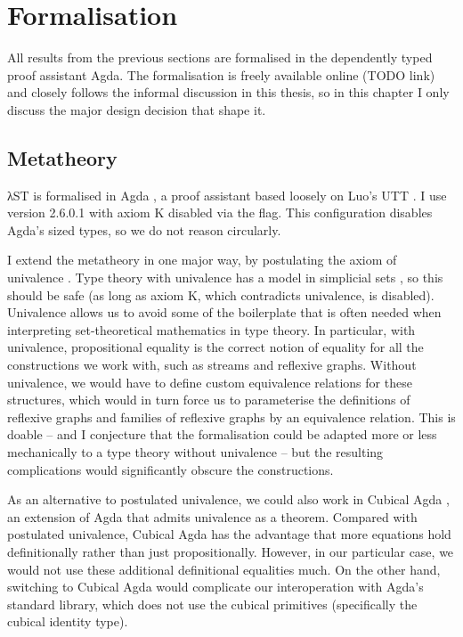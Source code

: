 \chapter{Formalisation}
\label{sec:formalisation}

All results from the previous sections are formalised in the dependently typed
proof assistant Agda. The formalisation is freely available online (TODO link)
and closely follows the informal discussion in this thesis, so in this chapter I
only discuss the major design decision that shape it.


\section{Metatheory}
\label{sec:formalisation:metatheory}

λST is formalised in Agda \cite{norellphd}, a proof assistant based loosely on
Luo's UTT \cite{luo1992}. I use version 2.6.0.1 with axiom K disabled via the
 flag. This configuration disables Agda's sized types, so we
do not reason circularly.

I extend the metatheory in one major way, by postulating the axiom of univalence
\cite{hottbook}. Type theory with univalence has a model in simplicial sets
\cite{kapulkin2012}, so this should be safe (as long as axiom K, which
contradicts univalence, is disabled). Univalence allows us to avoid some of the
boilerplate that is often needed when interpreting set-theoretical mathematics
in type theory. In particular, with univalence, propositional equality is the
correct notion of equality for all the constructions we work with, such as
streams and reflexive graphs. Without univalence, we would have to define custom
equivalence relations for these structures, which would in turn force us to
parameterise the definitions of reflexive graphs and families of reflexive
graphs by an equivalence relation. This is doable -- and I conjecture that the
formalisation could be adapted more or less mechanically to a type theory
without univalence -- but the resulting complications would significantly
obscure the constructions.

As an alternative to postulated univalence, we could also work in Cubical Agda
\cite{vezzosi2019}, an extension of Agda that admits univalence as a theorem.
Compared with postulated univalence, Cubical Agda has the advantage that more
equations hold definitionally rather than just propositionally. However, in our
particular case, we would not use these additional definitional equalities much.
On the other hand, switching to Cubical Agda would complicate our interoperation
with Agda's standard library, which does not use the cubical primitives
(specifically the cubical identity type).

